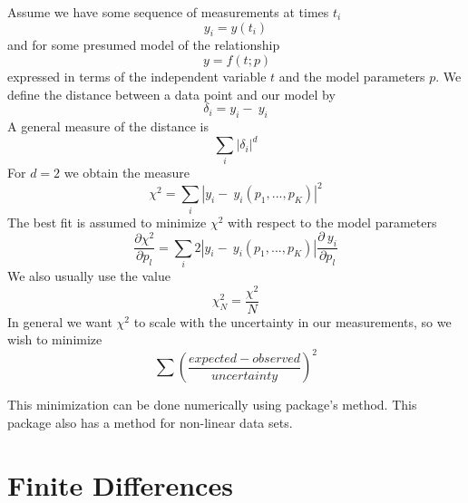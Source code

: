 \documentclass[12pt]{report}
\begin{document}
\begin{proc}{}{}
        Assume we have some sequence of measurements at times $t_i$ \begin{equation}
                y_i = y(t_i)
        \end{equation}
        and for some presumed model of the relationship \begin{equation}
                ~y = f(t;p)
        \end{equation}
        expressed in terms of the independent variable $t$ and the model parameters $p$. We define the distance between a data point and our model by \begin{equation}
                \delta_i = y_i - ~y_i
        \end{equation}
        A general measure of the distance is \begin{equation}
                \sum_i|\delta_i|^d
        \end{equation}
        For $d = 2$ we obtain the  measure \begin{equation}
                \chi^2 = \sum_i|y_i - ~y_i(p_1,...,p_K)|^2
        \end{equation}
        The best fit is assumed to minimize $\chi^2$ with respect to the model parameters \begin{equation}
                \frac{\partial \chi^2}{\partial p_l} = \sum_i2|y_i - ~y_i(p_1,...,p_K)|\frac{\partial ~y_i}{\partial p_l}
        \end{equation}
        We also usually use the  value \begin{equation}
                \chi^2_N = \frac{\chi^2}{N}
        \end{equation}
        In general we want $\chi^2$ to scale with the uncertainty in our measurements, so we wish to minimize \begin{equation}
                \sum\left(\frac{expected-observed}{uncertainty}\right)^2
        \end{equation}
\end{proc}

\begin{rmk}{}{}
        This minimization can be done numerically using  package's  method. This package also has a  method for non-linear data sets.
\end{rmk}

\section{Finite Differences}
\end{document}
